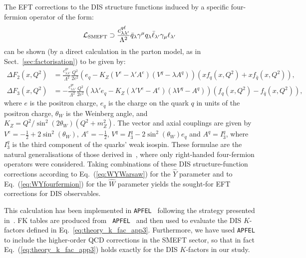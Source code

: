 \documentclass[withindex,glossary]{cam-thesis}
\begin{document}
The EFT corrections to the DIS structure functions induced by a specific four-fermion operator of the form:
\begin{equation}
\mathcal{L}_{\rm SMEFT} \supset \frac{c_{\lambda\lambda'}^{q\ell}}{\Lambda^2} \bar{q}_{\lambda} \gamma^{\mu} q_{\lambda} \bar{\ell}_{\lambda'} \gamma_{\mu} \ell_{\lambda'}
\end{equation}
can be shown (by a direct calculation in the parton model, as in Sect.~\ref{sec:factorisation}) to be given by:
\begin{align}
\Delta F_2(x,Q^2) &=  \frac{c_{\lambda\lambda'}^{qe}}{\Lambda^2}  \frac{Q^2  }{2e^2} \left( e_q - K_Z \left(V^e - \lambda' A^e\right)\left( V^q - \lambda A^q \right)  \right) \left( xf_q(x,Q^2) + xf_{\bar{q}}(x,Q^2) \right), \nonumber\\[1.5ex]
\Delta F_3(x,Q^2) &=-  \frac{c_{\lambda\lambda'}^{qe}}{\Lambda^2} \frac{Q^2}{2e^2} \left( \lambda \lambda' e_q - K_Z \left( \lambda' V^e - A^e \right) \left( \lambda V^q - A^q \right)\right) \left( f_q(x,Q^2) - f_{\bar{q}}(x,Q^2) \right),\nonumber
\end{align}
where $e$ is the positron charge, $e_q$ is the charge on the quark $q$ in units of the positron charge, $\theta_W$ is the Weinberg angle, and $K_Z = Q^2/\sin^2(2\theta_W)(Q^2 + m_Z^2).$
The vector and axial couplings are given by $V^e = -\frac{1}{2} +
2\sin^2(\theta_W)$, $A^e = -\frac{1}{2}$, $V^q = I_3^q -
2\sin^2(\theta_W)e_q$ and $A^q = I^q_3$,
where $I_3^q$ is the third
component of the quarks' weak isospin. These formulae are the natural
generalisations of those derived in~\cite{Carrazza:2019sec}, where only right-handed four-fermion
operators were considered.
%
Taking combinations of these DIS structure-function corrections according to
Eq.~(\ref{eq:WYWarsaw}) for the $\hat{Y}$ parameter and to Eq.~(\ref{eq:WYfourfermion}) for the $\hat{W}$ parameter
yields the sought-for EFT corrections for DIS observables.

This calculation has been implemented in {\tt APFEL}~\cite{Bertone_2014} following the strategy 
presented in~\cite{Carrazza:2019sec}. FK tables are produced from {\tt
  APFEL}~\cite{Bertone:2016lga} and then used to evaluate the DIS $K$-factors
defined in Eq.~\eqref{eq:theory_k_fac_app3}. Furthermore, we have used {\tt APFEL} to
include the higher-order QCD corrections in the SMEFT sector, so that in fact Eq.~(\ref{eq:theory_k_fac_app3})
holds exactly for the DIS $K$-factors in our study.
\end{document}
